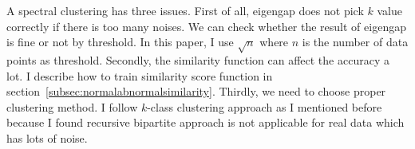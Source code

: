 A spectral clustering has three issues. 
First of all, eigengap does not pick $k$ value correctly if there is too many noises. 
We can check whether the result of eigengap is fine or not by threshold. 
In this paper, I use $\sqrt{n}$ where $n$ is the number of data points as threshold. 
Secondly, the similarity function can affect the accuracy a lot. 
I describe how to train similarity score function in section~\ref{subsec:normalabnormalsimilarity}. 
Thirdly, we need to choose proper clustering method. 
I follow $k$-class clustering approach as I mentioned before because I found recursive bipartite approach is not applicable for real data which has lots of noise. 
